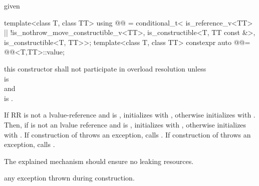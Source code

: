 \documentclass[ebook,11pt,article]{memoir}
\begin{document}
\begin{itemdescr}
\pnum
\remarks
given 
\begin{codeblock}
template<class T, class TT>
using @@ =
     conditional_t<
        is_reference_v<TT> || !is_nothrow_move_constructible_v<TT>,
        is_constructible<T, TT const &>,
        is_constructible<T, TT>>;
template<class T, class TT>
constexpr auto @@=
		@@<T,TT>::value;
\end{codeblock}
this constructor shall not participate in overload resolution unless
\\  is \\
and\\
 is .

\pnum
\effects If RR is not a lvalue-reference and  is , initializes  with , otherwise initializes  with . Then, if  is not an lvalue reference and  is , initializes   with , otherwise initializes  with . If construction of  throws an exception, calls .  If construction of  throws an exception, calls . 
\begin{note}
The explained mechanism should ensure no leaking resources.
\end{note}

\pnum
\throws any exception thrown during construction.
\end{itemdescr}
\end{document}
